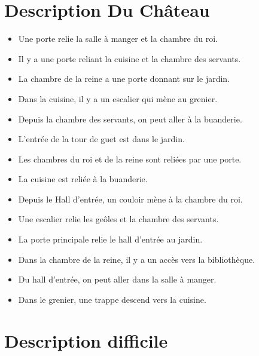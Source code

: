 \documentclass[dvipsnames]{article}
\begin{document}
\newpage
\section{Description Du Château}
\begin{itemize}
\item Une porte relie la salle à manger et la chambre du roi.
\item Il y a une porte reliant la cuisine et la chambre des servants.
\item La chambre de la reine a une porte donnant sur le jardin.
\item Dans la cuisine, il y a un escalier qui mène au grenier.
\item Depuis la chambre des servants, on peut aller à la buanderie.
\item L'entrée de la tour de guet est dans le jardin.
\item Les chambres du roi et de la reine sont reliées par une porte.
\item La cuisine est reliée à la buanderie.
\item Depuis le Hall d'entrée, un couloir mène à la chambre du roi.
\item Une escalier relie les geôles et la chambre des servants.
\item La porte principale relie le hall d'entrée au jardin.
\item Dans la chambre de la reine, il y a un accès vers la bibliothèque.
\item Du hall d'entrée, on peut aller dans la salle à manger.
\item Dans le grenier, une trappe descend vers la cuisine.
\end{itemize}

\newpage
\section{Description difficile}
\end{document}
